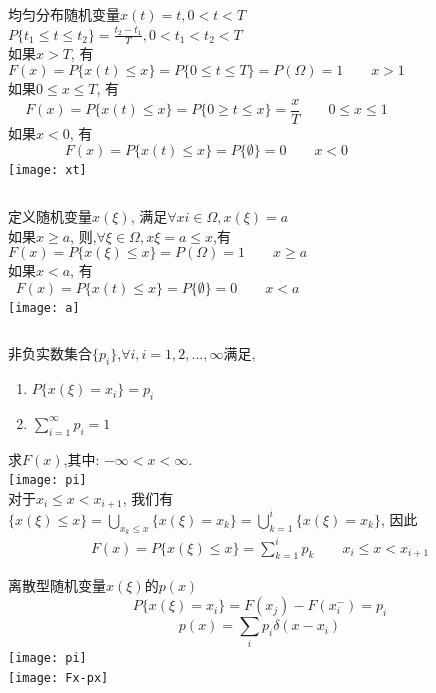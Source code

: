 \begin{frame}
\begin{columns}
	均匀分布随机变量$x(t)=t,0<t<T$\\
	$P\{t_1\le t\le t_2\}=\frac{t_2-t_1}{T},0<t_1<t_2<T$\\
	如果$x> T$, 有
	\[F(x)=P\{x(t)\le x \}=P\{0\le t\le T \}=P(\Omega)= 1\qquad x> 1 \] 
	如果$0\le x\le T$, 有
	\[F(x)=P\{x(t)\le x \}=P\{0\ge t\le x\}=\frac{x}{T} \qquad 0\le x\le 1 \] 
	如果$x<0$, 有
	\[F(x)=P\{x(t)\le x \}=P\{\emptyset\}=0 \qquad x<0 \] 
	\texttt{[image: xt]}
\end{columns}
\end{frame}

\begin{frame}
\begin{columns}
	定义随机变量$x(\xi)$, 满足$\forall xi\in\Omega, x(\xi)=a$\\
	如果$x\ge a$, 则,$\forall \xi\in\Omega, x{\xi}=a\le x$,有
	\[F(x)=P\{x(\xi)\le x \}=P(\Omega)= 1\qquad x\ge a \] 
	如果$x<a$, 有
	\[F(x)=P\{x(t)\le x \}=P\{\emptyset\}=0 \qquad x<a \] 
	\texttt{[image: a]}
\end{columns}
\end{frame}

\begin{frame}[shrink]
非负实数集合$\{p_i\}$,$\forall i, i=1,2,\dots,\infty$满足, 
\begin{enumerate}
	\item $P\{x(\xi)=x_i\}=p_i$
	\item $\sum\limits_{i=1}^{\infty}p_i=1$
\end{enumerate}
求$F(x)$,其中: $-\infty<x<\infty$.\\
\texttt{[image: pi]}\\
对于$x_i\le x<x_{i+1}$, 我们有$\{x(\xi)\le x \}=\bigcup\limits_{x_k\le x}\{x(\xi)=x_k\}=\bigcup\limits_{k=1}^{i}\{x(\xi)=x_k\}$, 因此
\begin{align*}
F(x)=P\{x(\xi)\le x\}=\sum\limits_{k=1}^{i}p_k \qquad x_i\le x<x_{i+1}
\end{align*}
\end{frame}

\begin{frame}{离散型随机变量$x(\xi)$的$p(x)$}
\[P\{x(\xi)=x_i\}=F(x_j)-F(x_i^{-})=p_i\]
\[p(x)=\sum\limits_{i}p_i\delta(x-x_i) \]
\texttt{[image: pi]}\\
\texttt{[image: Fx-px]}
\end{frame}


